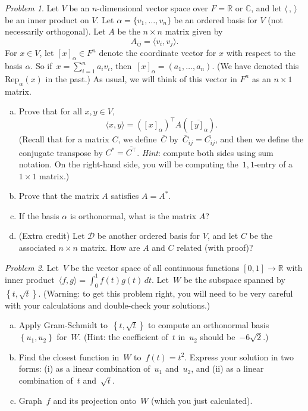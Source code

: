 \documentclass[11pt,twoside]{amsart}
\theoremstyle{plain}
\theoremstyle{remark}
\newtheorem{prob}{Problem}
\theoremstyle{definition}
\theoremstyle{definition}
\newcommand{\R}{\mathbb{R}}
\newcommand{\C}{\mathbb{C}}
\begin{document}
\begin{prob}
Let $V$ be an $n$-dimensional vector space over $F=\R$ or $\C$, and let
  $\langle \, , \, \rangle$ be an inner product on $V$. Let $\alpha=\{ v_1,
  \dots, v_n \}$ be an ordered basis for $V$ (not necessarily orthogonal). Let
  $A$ be the $n\times n$ matrix given by 
  \[
    A_{ij}=\langle v_i,v_j\rangle.
  \]
  For $x\in V$, let $[x]_\alpha\in F^n$ denote the coordinate vector for
  $x$ with respect to the basis $\alpha$.  So if~$x=\sum_{i=1}^na_iv_i$,
  then~$[x]_{\alpha}=(a_1,\dots,a_n)$.  (We have denoted this $\mathrm{Rep}_\alpha(x)$ in the past.)  As usual, we will think of this
  vector in $F^n$ as an $n \times 1$ matrix.
\begin{enumerate}[(a)]
 \item Prove that for all $x,y\in V$, 
 \[
   \langle x,y \rangle = \left([x]_\alpha\right)^\top A\left(
 \overline{[y]_\alpha}\right).
 \] 
 (Recall that for a matrix $C$,  we define~$\overline{C}$
   by~$\overline{C}_{ij}=\overline{C_{ij}}$, and then we define the conjugate
   transpose by $C^\ast = \overline{C^\top}$. \emph{Hint}: compute both sides using
   sum notation.  On the right-hand side, you will be computing the~$1,1$-entry
 of a~$1\times 1$ matrix.)
 \item Prove that the matrix $A$ satisfies $A=A^*$.
 \item If the basis $\alpha$ is orthonormal, what is the matrix $A$?
 \item (Extra credit) Let $\mathcal{D}$ be another ordered basis for $V$, and
   let $C$ be the associated $n\times n$ matrix. How are $A$ and $C$ related
   (with proof)?
\end{enumerate}
\end{prob}

\begin{prob}
Let~$V$ be the vector space of all continuous functions $[0,1]\to\R$ with
  inner product~$\langle f,g\rangle=\int_0^1f(t)g(t)\,dt$.  Let~$W$ be the
  subspace spanned by~$\left\{ t,\sqrt{t} \right\}$. (Warning: to get this
  problem right, you will need to be very careful with your calculations and
double-check your solutions.)  
\begin{enumerate}[(a)]
    \item Apply Gram-Schmidt to~$\left\{ t,\sqrt{t} \right\}$ to compute an orthonormal basis
      $\left\{ u_1,u_2 \right\}$ for~$W$. (Hint: the coefficient of~$t$
      in~$u_2$ should be~$-6\sqrt{2}$.)
    \item Find the closest function in~$W$ to~$f(t)=t^2$.  Express your solution
      in two forms: (i) as a linear combination of~$u_1$ and~$u_2$, and (ii) as
      a linear combination of~$t$ and~$\sqrt{t}$.
    \item Graph~$f$ and its projection onto~$W$ (which you just calculated).
  \end{enumerate}
\end{prob}
\end{document}
